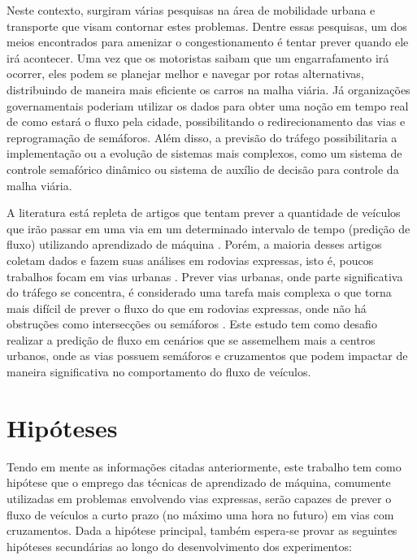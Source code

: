 Neste contexto, surgiram várias pesquisas na área de mobilidade urbana e transporte que visam contornar estes problemas. Dentre essas pesquisas, um dos meios encontrados para amenizar o congestionamento é tentar prever quando ele irá acontecer. Uma vez que os motoristas saibam que um engarrafamento irá ocorrer, eles podem se planejar melhor e navegar por rotas alternativas, distribuindo de maneira mais eficiente os carros na malha viária. Já organizações governamentais poderiam utilizar os dados para obter uma noção em tempo real de como estará o fluxo pela cidade, possibilitando o redirecionamento das vias e reprogramação de semáforos. Além disso, a previsão do tráfego possibilitaria a implementação ou a evolução de sistemas mais complexos, como um sistema de controle semafórico dinâmico ou sistema de auxílio de decisão para controle da malha viária.

A literatura está repleta de artigos que tentam prever a quantidade de veículos que irão passar em uma via em um determinado intervalo de tempo (predição de fluxo) utilizando aprendizado de máquina \cite{doi:10.1080/01441647.2014.992496, fu2016using, hamed_prediction_1995, lv_6894591, Seoul, wang_2018, Xiaolei_2015, Zainab_2018}. Porém, a maioria desses artigos coletam dados e fazem suas análises em rodovias expressas, isto é, poucos trabalhos focam em vias urbanas \cite{lana_2018}. Prever vias urbanas, onde parte significativa do tráfego se concentra, é considerado uma tarefa mais complexa o que torna mais difícil de prever o fluxo do que em rodovias expressas, onde não há obstruções como intersecções ou semáforos \cite{lana_2018}. Este estudo tem como desafio realizar a predição de fluxo em cenários que se assemelhem mais a centros urbanos, onde as vias possuem semáforos e cruzamentos que podem impactar de maneira significativa no comportamento do fluxo de veículos.

\section{Hipóteses}
\label{chapter:hipoteses}
Tendo em mente as informações citadas anteriormente, este trabalho tem como hipótese que o emprego das técnicas de aprendizado de máquina, comumente utilizadas em problemas envolvendo vias expressas, serão capazes de prever o fluxo de veículos a curto prazo (no máximo uma hora no futuro) em vias com cruzamentos. Dada a hipótese principal, também espera-se provar as seguintes hipóteses secundárias ao longo do desenvolvimento dos experimentos:

